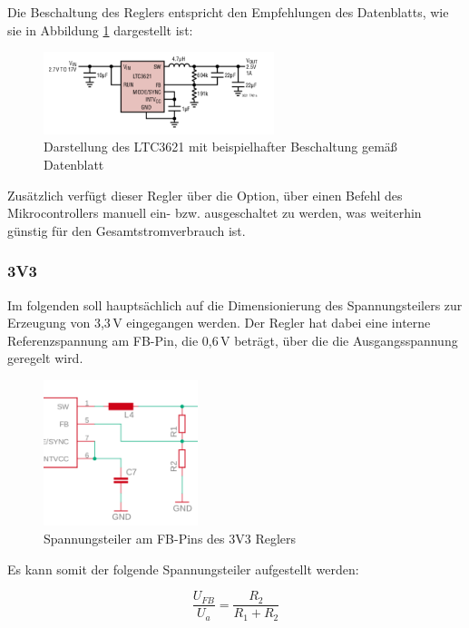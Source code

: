 Die Beschaltung des Reglers entspricht den Empfehlungen des Datenblatts, wie sie in Abbildung \ref{fig.ltc3621} dargestellt ist:

\begin{figure}[H]
  \centering
  \includegraphics[width=0.6\textwidth]{./img/ltc3621.png}
  \caption{Darstellung des LTC3621 mit beispielhafter Beschaltung gemäß Datenblatt~\cite{ltc3621}}\label{fig.ltc3621}
\end{figure}

Zusätzlich verfügt dieser Regler über die Option, über einen Befehl des Mikrocontrollers manuell ein- bzw. ausgeschaltet zu werden, was weiterhin günstig für den Gesamtstromverbrauch ist.

\subsubsection{3V3}\label{subsubsec.3v3}
Im folgenden soll hauptsächlich auf die Dimensionierung des Spannungsteilers zur Erzeugung von 3,3\,V eingegangen werden. Der Regler hat dabei eine interne Referenzspannung am FB-Pin, die 0,6\,V beträgt, über die die Ausgangsspannung geregelt wird. 

\begin{figure}[H]
  \centering
  \includegraphics[width=0.4\textwidth]{./img/spannungsteiler_3v3.png}
  \caption{Spannungsteiler am FB-Pins des 3V3 Reglers}\label{fig.spgsteiler3v3}
\end{figure}

Es kann somit der folgende Spannungsteiler aufgestellt werden:

\begin{minipage}{\textwidth}
\begin{equation}\label{eq:Spannungsteiler}
\frac {U_{FB}}{U_a}{=}  \frac{R_2}{R_1+R_2}
\end{equation}
\end{minipage}

